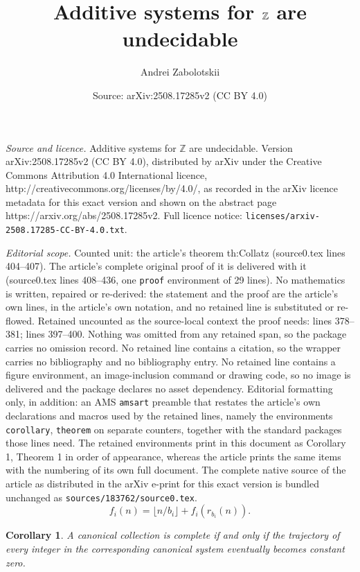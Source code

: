 \documentclass[10pt,a4paper]{amsart}
\title{Additive systems for $\Z$ are undecidable}
\author{Andrei Zabolotskii}
\date{Source: arXiv:2508.17285v2 (CC BY 4.0)}
\newtheorem{corollary}{Corollary}
\newcommand{\Z}{\mathbb{Z}}
\begin{document}
\maketitle

\noindent\emph{Source and licence.} Additive systems for $\Z$ are undecidable. Version arXiv:2508.17285v2 (CC BY 4.0), distributed by arXiv under the Creative Commons Attribution 4.0 International licence, http://creativecommons.org/licenses/by/4.0/, as recorded in the arXiv licence metadata for this exact version and shown on the abstract page https://arxiv.org/abs/2508.17285v2. Full licence notice: \texttt{licenses/arxiv-2508.17285-CC-BY-4.0.txt}.\par\smallskip

\noindent\textit{Editorial scope.} Counted unit: the article's theorem th:Collatz (source0.tex lines 404--407). The article's complete original proof of it is delivered with it (source0.tex lines 408--436, one \texttt{proof} environment of 29 lines). No mathematics is written, repaired or re-derived: the statement and the proof are the article's own lines, in the article's own notation, and no retained line is substituted or re-flowed.  Retained uncounted as the source-local context the proof needs: lines 378--381; lines 397--400.  Nothing was omitted from any retained span, so the package carries no omission record.  No retained line contains a citation, so the wrapper carries no bibliography and no bibliography entry.  No retained line contains a figure environment, an image-inclusion command or drawing code, so no image is delivered and the package declares no asset dependency.  Editorial formatting only, in addition: an AMS \texttt{amsart} preamble that restates the article's own declarations and macros used by the retained lines, namely the environments \texttt{corollary}, \texttt{theorem} on separate counters, together with the standard packages those lines need.  The retained environments print in this document as Corollary 1, Theorem 1 in order of appearance, whereas the article prints the same items with the numbering of its own full document.  The complete native source of the article as distributed in the arXiv e-print for this exact version is bundled unchanged as \texttt{sources/183762/source0.tex}.
\begin{equation}
\label{eq:fn2}
f_i(n) = \lfloor n/b_i \rfloor + f_i(r_{b_i}(n)).
\end{equation}

\begin{corollary}
\label{cor:coll-dyn}
A canonical collection is complete if and only if the trajectory of every integer in the corresponding canonical system eventually becomes constant zero.
\end{corollary}
\end{document}
